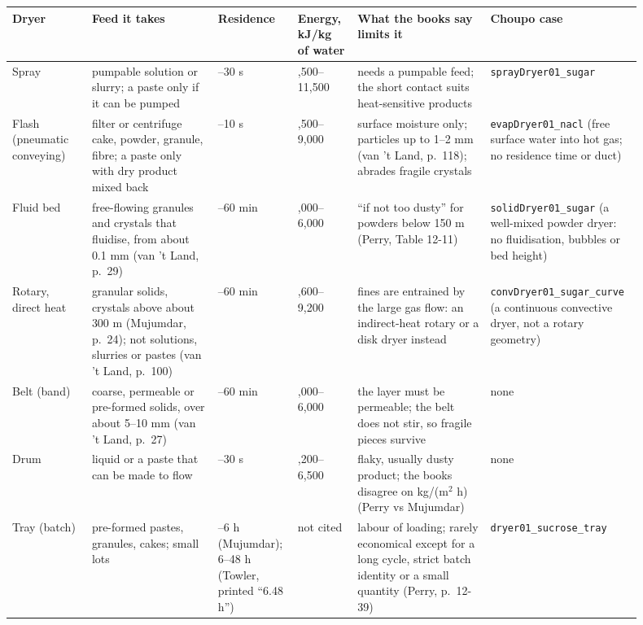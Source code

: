 \documentclass[11pt,a4paper]{article}
\begin{document}
\begin{longtable}[]{@{}>{\raggedright\arraybackslash}p{0.12\linewidth}>{\raggedright\arraybackslash}p{0.19\linewidth}>{\raggedright\arraybackslash}p{0.11\linewidth}>{\raggedright\arraybackslash}p{0.09\linewidth}>{\raggedright\arraybackslash}p{0.2\linewidth}>{\raggedright\arraybackslash}p{0.19\linewidth}@{}}
\toprule\noalign{}
Dryer & Feed it takes & Residence & Energy, kJ/kg of water & What the books say limits it & Choupo case \\
\midrule\noalign{}
\endhead
\bottomrule\noalign{}
\endlastfoot
Spray & pumpable solution or slurry; a paste only if it can be pumped & 10--30 s & 4,500--11,500 & needs a pumpable feed; the short contact suits heat-sensitive products & \texttt{sprayDryer01\_sugar} \\
Flash (pneumatic conveying) & filter or centrifuge cake, powder, granule, fibre; a paste only with dry product mixed back & 0--10 s & 4,500--9,000 & surface moisture only; particles up to 1--2 mm (van 't Land, p.~118); abrades fragile crystals & \texttt{evapDryer01\_nacl} (free surface water into hot gas; no residence time or duct) \\
Fluid bed & free-flowing granules and crystals that fluidise, from about 0.1 mm (van 't Land, p.~29) & 10--60 min & 4,000--6,000 & ``if not too dusty'' for powders below 150 \textmu{}m (Perry, Table 12-11) & \texttt{solidDryer01\_sugar} (a well-mixed powder dryer: no fluidisation, bubbles or bed height) \\
Rotary, direct heat & granular solids, crystals above about 300 \textmu{}m (Mujumdar, p.~24); not solutions, slurries or pastes (van 't Land, p.~100) & 10--60 min & 4,600--9,200 & fines are entrained by the large gas flow: an indirect-heat rotary or a disk dryer instead & \texttt{convDryer01\_sugar\_curve} (a continuous convective dryer, not a rotary geometry) \\
Belt (band) & coarse, permeable or pre-formed solids, over about 5--10 mm (van 't Land, p.~27) & 10--60 min & 4,000--6,000 & the layer must be permeable; the belt does not stir, so fragile pieces survive & none \\
Drum & liquid or a paste that can be made to flow & 10--30 s & 3,200--6,500 & flaky, usually dusty product; the books disagree on kg/(m\(^2\) h) (Perry vs Mujumdar) & none \\
Tray (batch) & pre-formed pastes, granules, cakes; small lots & 1--6 h (Mujumdar); 6--48 h (Towler, printed ``6.48 h'') & not cited & labour of loading; rarely economical except for a long cycle, strict batch identity or a small quantity (Perry, p.~12-39) & \texttt{dryer01\_sucrose\_tray} \\

\end{longtable}
\end{document}
